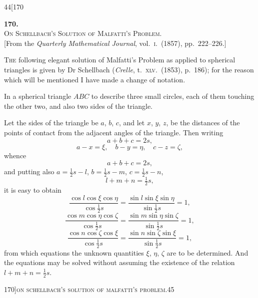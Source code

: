 \documentclass[11pt]{article}
\begin{document}
\newpage

\begin{center}
\small\textsc{44}\hfill\hfill[170
\end{center}

\bigskip

\begin{center}
{\large\textbf{170.}}\\[1em]
{\large\scshape On Schellbach's Solution of Malfatti's Problem.}\\[1em]
{\small [From the \textit{Quarterly Mathematical Journal}, vol.~\textsc{i}.\ (1857), pp.~222--226.]}
\end{center}

\bigskip

\textsc{The} following elegant solution of Malfatti's Problem as applied to spherical triangles
is given by Dr Schellbach (\textit{Crelle}, t.~\textsc{xlv}.\ (1853), p.~186); for the reason which will
be mentioned I have made a change of notation.

In a spherical triangle $ABC$ to describe three small circles, each of them touching
the other two, and also two sides of the triangle.

Let the sides of the triangle be $a$, $b$, $c$, and let $x$, $y$, $z$, be the distances of the
points of contact from the adjacent angles of the triangle. Then writing
\[
a + b + c = 2s,
\]
\[
a - x = \xi,\quad b - y = \eta,\quad c - z = \zeta,
\]
whence
\[
a + b + c = 2s,
\]
and putting also $a = \tfrac{1}{2} s - l$, $b = \tfrac{1}{2} s - m$, $c = \tfrac{1}{2} s - n$,
\[
l + m + n = \tfrac{1}{2} s,
\]
it is easy to obtain
\[
\frac{\cos l \cos\xi \cos\eta}{\cos\tfrac{1}{2} s} = \frac{\sin l \sin\xi \sin\eta}{\sin\tfrac{1}{2} s} = 1,
\]
\[
\frac{\cos m \cos\eta \cos\zeta}{\cos\tfrac{1}{2} s} = \frac{\sin m \sin\eta \sin\zeta}{\sin\tfrac{1}{2} s} = 1,
\]
\[
\frac{\cos n \cos\zeta \cos\xi}{\cos\tfrac{1}{2} s} = \frac{\sin n \sin\zeta \sin\xi}{\sin\tfrac{1}{2} s} = 1,
\]
from which equations the unknown quantities $\xi$, $\eta$, $\zeta$ are to be determined. And the
equations may be solved without assuming the existence of the relation $l + m + n = \tfrac{1}{2} s$.

\newpage

\begin{center}
\small 170]\hfill\textsc{on schellbach's solution of malfatti's problem.}\hfill\textsc{45}
\end{center}
\end{document}
